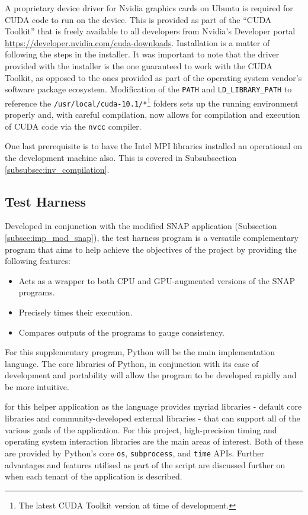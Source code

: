 \documentclass[conference]{IEEEtran}
\begin{document}
A proprietary device driver for Nvidia graphics cards on Ubuntu is required for CUDA code to run on the device. This is provided as part of the ``CUDA Toolkit'' that is freely available to all developers from Nvidia's Developer portal \url{https://developer.nvidia.com/cuda-downloads}. Installation is a matter of following the steps in the installer. It was important to note that the driver provided with the installer is the one guaranteed to work with the CUDA Toolkit, as opposed to the ones provided as part of the operating system vendor's software package ecosystem. Modification of the \texttt{PATH} and \texttt{LD\_LIBRARY\_PATH} to reference the \texttt{/usr/local/cuda-10.1/*}\footnote{The latest CUDA Toolkit version at time of development.} folders sets up the running environment properly and, with careful compilation, now allows for compilation and execution of CUDA code via the \texttt{nvcc} compiler.

One last prerequisite is to have the Intel MPI libraries installed an operational on the development machine also. This is covered in Subsubsection \ref{subsubsec:inv_compilation}.


\subsection{Test Harness}
\label{subsec:imp_testharness}


Developed in conjunction with the modified SNAP application (Subsection \ref{subsec:imp_mod_snap}), the test harness program is a versatile complementary program that aims to help achieve the objectives of the project by providing the following features:

\begin{itemize}
    \item Acts as a wrapper to both CPU and GPU-augmented versions of the SNAP programs.
    \item Precisely times their execution.
    \item Compares outputs of the programs to gauge consistency.
\end{itemize}

For this supplementary program, Python will be the main implementation language. The core libraries of Python, in conjunction with its ease of development and portability will allow the program to be developed rapidly and be more intuitive.



for this helper application as the language provides myriad libraries - default core libraries and community-developed external libraries - that can support all of the various goals of the application. For this project, high-precision timing and operating system interaction libraries are the main areas of interest. Both of these are provided by Python's core \texttt{os}, \texttt{subprocess}, and \texttt{time} APIs. Further advantages and features utilised as part of the script are discussed further on when each tenant of the application is described.
\end{document}
